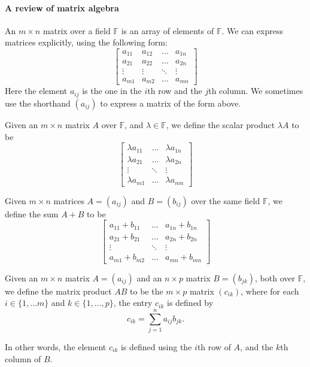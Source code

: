 \documentclass{article}
\theoremstyle{plain}
\newcommand{\bF}{\mathbb{F}}
\begin{document}
\paragraph{A review of matrix algebra}


An $m\times n$ matrix over a field $\bF$ is an array of elements of $\bF$. We can express matrices explicitly, using the following form:
\[
\begin{bmatrix}
a_{11} & a_{12} & \dots & a_{1n}\\
a_{21} & a_{22} & \dots & a_{2n} \\
\vdots & \vdots & \ddots & \vdots \\
a_{m1} & a_{m2} & \dots & a_{mn}
\end{bmatrix}
\]
Here the element $a_{ij}$ is the one in the $i$th row and the $j$th column. We sometimes use the shorthand $(a_{ij})$ to express a matrix of the form above.


Given an $m\times n$ matrix $A$ over $\bF$, and $\lambda\in\bF$, we define the scalar product $\lambda A$ to be
\[
\begin{bmatrix}
\lambda a_{11}  & \dots & \lambda a_{1n} \\
\lambda a_{21}  &  \dots & \lambda a_{2n} \\
\vdots & \ddots & \vdots \\
\lambda a_{m1}  & \dots & \lambda a_{mn} 
\end{bmatrix}
\]

Given $m\times n$ matrices $A = (a_{ij})$ and $B=(b_{ij})$ over the same field $\bF$, we define the sum $A+B$ to be 
\[
\begin{bmatrix}
a_{11} + b_{11} & \dots & a_{1n} + b_{1n}\\
a_{21} + b_{21} &  \dots & a_{2n} + b_{2n} \\
\vdots & \ddots & \vdots \\
a_{m1} + b_{m2}  & \dots & a_{mn} + b_{mn}
\end{bmatrix}
\]

Given an $m\times n$ matrix $A = (a_{ij})$ and an $n\times p$ matrix $B = (b_{jk})$, both over $\bF$, we define the matrix product $AB$ to be the $m\times p$ matrix $(c_{ik})$, where for each $i\in \{1,\ldots m\}$ and $k\in \{1,\ldots, p\}$, the entry $c_{ik}$ is defined by
\[c_{ik} = \sum_{j=1}^n a_{ij}b_{jk}.\]

In other words, the element $c_{ik}$ is defined using the $i$th row of $A$, and the $k$th column of $B$.
\end{document}

